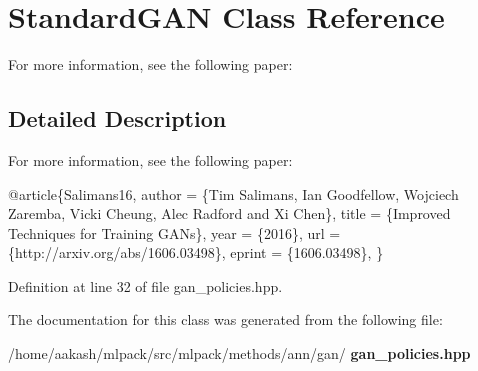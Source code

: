 \section{Standard\+G\+AN Class Reference}
\label{classmlpack_1_1ann_1_1StandardGAN}


For more information, see the following paper\+:  




\subsection{Detailed Description}
For more information, see the following paper\+: 


\begin{DoxyCode}
@article\{Salimans16,
  author    = \{Tim Salimans, Ian Goodfellow, Wojciech Zaremba,
               Vicki Cheung, Alec Radford and Xi Chen\},
  title     = \{Improved Techniques \textcolor{keywordflow}{for} Training GANs\},
  year      = \{2016\},
  url       = \{http:\textcolor{comment}{//arxiv.org/abs/1606.03498\},}
  eprint    = \{1606.03498\},
\}
\end{DoxyCode}
 

Definition at line 32 of file gan\+\_\+policies.\+hpp.



The documentation for this class was generated from the following file\+:\begin{DoxyCompactItemize}
\item 
/home/aakash/mlpack/src/mlpack/methods/ann/gan/\textbf{ gan\+\_\+policies.\+hpp}\end{DoxyCompactItemize}
